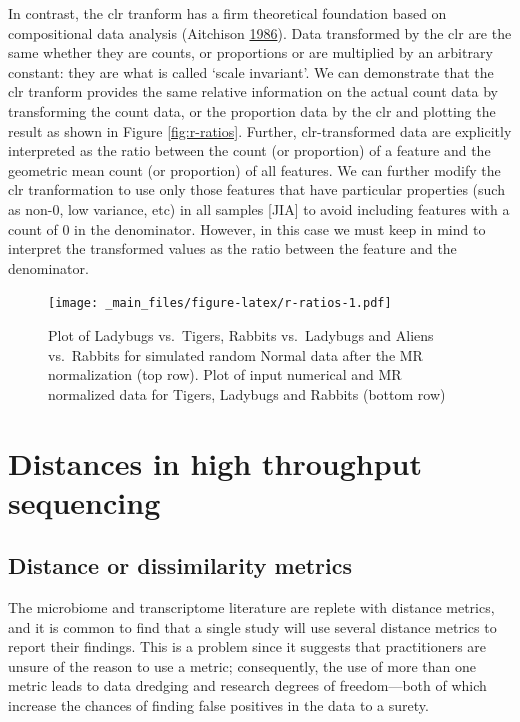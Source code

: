 \documentclass[onecolumn]{book}
\theoremstyle{definition}
\theoremstyle{definition}
\theoremstyle{definition}
\theoremstyle{remark}
\begin{document}
In contrast, the clr tranform has a firm theoretical foundation based on
compositional data analysis (Aitchison
\protect\hyperlink{ref-Aitchison:1986}{1986}). Data transformed by the
clr are the same whether they are counts, or proportions or are
multiplied by an arbitrary constant: they are what is called `scale
invariant'. We can demonstrate that the clr tranform provides the same
relative information on the actual count data by transforming the count
data, or the proportion data by the clr and plotting the result as shown
in Figure \ref{fig:r-ratios}. Further, clr-transformed data are
explicitly interpreted as the ratio between the count (or proportion) of
a feature and the geometric mean count (or proportion) of all features.
We can further modify the clr tranformation to use only those features
that have particular properties (such as non-0, low variance, etc) in
all samples {[}JIA{]} to avoid including features with a count of 0 in
the denominator. However, in this case we must keep in mind to interpret
the transformed values as the ratio between the feature and the
denominator.

\begin{figure}
\centering
\texttt{[image: \_main\_files/figure-latex/r-ratios-1.pdf]}
\caption{\label{fig:r-ratios}\label{R_random} Plot of Ladybugs vs.~Tigers,
Rabbits vs.~Ladybugs and Aliens vs.~Rabbits for simulated random Normal
data after the MR normalization (top row). Plot of input numerical and
MR normalized data for Tigers, Ladybugs and Rabbits (bottom row)}
\end{figure}

\hypertarget{distances}{%
\chapter{Distances in high throughput sequencing}\label{distances}}

\hypertarget{distance-or-dissimilarity-metrics}{%
\section{Distance or dissimilarity
metrics}\label{distance-or-dissimilarity-metrics}}

The microbiome and transcriptome literature are replete with distance
metrics, and it is common to find that a single study will use several
distance metrics to report their findings. This is a problem since it
suggests that practitioners are unsure of the reason to use a metric;
consequently, the use of more than one metric leads to data dredging and
research degrees of freedom---both of which increase the chances of
finding false positives in the data to a surety.
\end{document}
